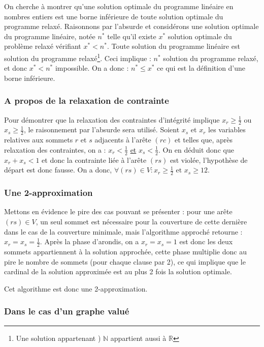 On cherche à montrer qu'une solution optimale du programme linéaire en nombres entiers est une borne
inférieure de toute solution optimale du programme relaxé. Raisonnons par l'absurde et considérons
une solution optimale du programme linéaire, notée $n^*$ telle qu'il existe $x^*$ solution optimale du problème
relaxé vérifiant $x^* < n^*$. Toute solution du programme linéaire est solution du programme
relaxé\footnote{Une solution appartenant ) $\mathbb{N}$ appartient aussi à $\mathbb{R}$}. Ceci
implique : $n^*$ solution du programme relaxé, et donc $x^* < n^*$ impossible. On a donc : $n^* \leq
x^*$ ce qui est la définition d'une borne inférieure.

\subsubsection{A propos de la relaxation de contrainte}

Pour démontrer que la relaxation des contraintes d'intégrité implique $x_r \geq \frac{1}{2}$ ou $x_s
\geq \frac{1}{2}$, le raisonnement par l'absurde sera utilisé. 
Soient $x_s$ et $x_r$ les variables relatives aux sommets $r$ et $s$ adjacents à l'arête $(rc)$ et
telles que, après relaxation des contraintes, on a : $x_r < \frac{1}{2}$ \underline{et} $x_s <
\frac{1}{2}$. On en déduit donc que $x_r + x_s < 1$ et donc la contrainte liée à l'arête $(rs)$ est
violée, l'hypothèse de départ est donc fausse. On a donc, $\forall (rs) \in V : x_r \geq \frac{1}{2}
\mbox{ et } x_s \geq{1}{2}$.

\subsubsection{Une 2-approximation}

Mettons en évidence le pire des cas pouvant se présenter : pour une arête $(rs) \in V$, un seul
sommet est nécessaire pour la couverture de cette dernière dans le cas de la couverture minimale,
mais l'algorithme approché retourne : $x_r = x_s = \frac{1}{2}$. Après la phase d'arondis, on a $x_r
= x_s = 1$ est donc les deux sommets appartiennent à la solution approchée, cette phase multiplie
donc au pire le nombre de sommets (pour chaque clause par 2), ce qui implique que le cardinal de la
solution approximée est au plus 2 fois la solution optimale.

Cet algorithme est donc une 2-approximation.

\subsubsection{Dans le cas d'un graphe valué}

